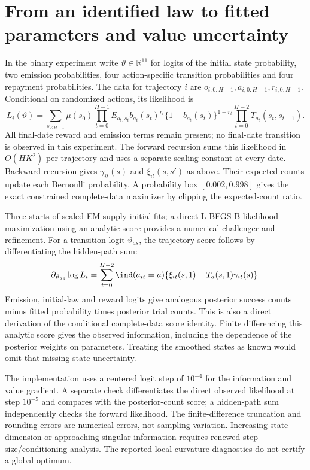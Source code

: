 \section{From an identified law to fitted parameters and value uncertainty}
\label{s4:latent-inference}
In the binary experiment write $\vartheta\in\mathbb R^{11}$ for logits
of the initial state probability, two emission probabilities, four
action-specific transition probabilities and four repayment probabilities.
The data for trajectory $i$ are $o_{i,0:H-1},a_{i,0:H-1},r_{i,0:H-1}$.
Conditional on randomized actions, its likelihood is
\[
 L_i(\vartheta)=\sum_{s_{0:H-1}}\mu(s_0)
 \prod_{t=0}^{H-1}E_{o_t,s_t}
     b_{a_t}(s_t)^{r_t}\{1-b_{a_t}(s_t)\}^{1-r_t}
 \prod_{t=0}^{H-2}T_{a_t}(s_t,s_{t+1}).
\]
All final-date reward and emission terms remain present; no final-date
transition is observed in this experiment. The forward recursion sums
this likelihood in $O(HK^2)$ per trajectory and uses a separate scaling
constant at every date. Backward recursion gives $\gamma_{it}(s)$ and
$\xi_{it}(s,s')$ as above. Their expected counts update each Bernoulli
probability. A probability box $[0.002,0.998]$ gives the exact constrained
complete-data maximizer by clipping the expected-count ratio.

Three starts of scaled EM supply initial fits; a direct L-BFGS-B
likelihood maximization using an analytic score provides a numerical
challenger and refinement. For a transition logit $\vartheta_{as}$, the
trajectory score follows by differentiating the hidden-path sum:
\[
 \partial_{\vartheta_{as}}\log L_i
 =\sum_{t=0}^{H-2}\ind(a_{it}=a)
       \{\xi_{it}(s,1)-T_a(s,1)\gamma_{it}(s)\}.
\]
Emission, initial-law and reward logits give analogous posterior success
counts minus fitted probability times posterior trial counts. This is
also a direct derivation of the conditional complete-data score identity.
Finite differencing this analytic score gives the observed information,
including the dependence of the posterior weights on parameters. Treating
the smoothed states as known would omit that missing-state uncertainty.

The implementation uses a centered logit step of $10^{-4}$ for the
information and value gradient. A separate check differentiates the direct
observed likelihood at step $10^{-5}$ and compares with the posterior-count
score; a hidden-path sum independently checks the forward likelihood.
The finite-difference truncation and rounding errors are numerical errors,
not sampling variation. Increasing state dimension or approaching singular
information requires renewed step-size/conditioning analysis. The reported
local curvature diagnostics do not certify a global optimum.

